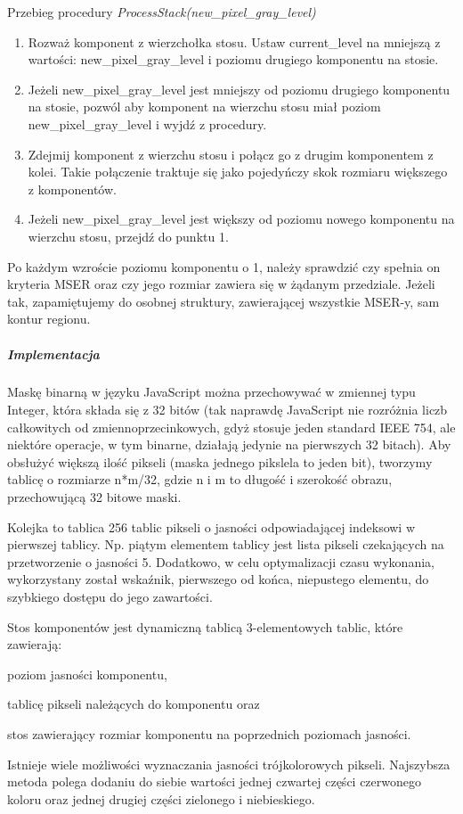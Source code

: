 Przebieg procedury \textit{ProcessStack(new\_pixel\_gray\_level)}
\begin{enumerate} \item Rozważ komponent z wierzchołka stosu. Ustaw
current\_level na mniejszą z wartości: new\_pixel\_gray\_level i poziomu
drugiego komponentu na stosie. \item Jeżeli new\_pixel\_gray\_level jest
mniejszy od poziomu drugiego komponentu na stosie, pozwól aby komponent na
wierzchu stosu miał poziom new\_pixel\_gray\_level i wyjdź z procedury. \item
Zdejmij komponent z wierzchu stosu i połącz go z drugim komponentem z kolei.
Takie połączenie traktuje się jako pojedyńczy skok rozmiaru większego z komponentów.
\item Jeżeli new\_pixel\_gray\_level jest większy od poziomu nowego komponentu
na wierzchu stosu, przejdź do punktu 1. \end{enumerate}

Po każdym wzroście poziomu komponentu o 1, należy sprawdzić czy spełnia on
kryteria MSER oraz czy jego rozmiar zawiera się w żądanym przedziale. Jeżeli
tak, zapamiętujemy do osobnej struktury, zawierającej wszystkie MSER-y, sam
kontur regionu.

\subparagraph{Implementacja}

Maskę binarną w języku JavaScript można przechowywać w zmiennej typu Integer,
która składa się z 32 bitów (tak naprawdę JavaScript nie rozróżnia liczb
całkowitych od zmiennoprzecinkowych, gdyż stosuje jeden standard IEEE 754, ale
niektóre operacje, w tym binarne, działają jedynie na pierwszych 32 bitach).
Aby obsłużyć większą ilość pikseli (maska jednego pikslela to jeden bit),
tworzymy tablicę o rozmiarze n*m/32, gdzie n i m to długość i szerokość obrazu,
przechowującą 32 bitowe maski.

Kolejka to tablica 256 tablic pikseli o jasności odpowiadającej indeksowi w
pierwszej tablicy. Np. piątym elementem tablicy jest lista pikseli czekających
na przetworzenie o jasności 5. Dodatkowo, w celu optymalizacji czasu wykonania,
wykorzystany został wskaźnik, pierwszego od końca, niepustego elementu, do
szybkiego dostępu do jego zawartości.

Stos komponentów jest dynamiczną tablicą 3-elementowych tablic, które
zawierają: \begin{inparaenum} \item poziom jasności komponentu, \item tablicę
  pikseli należących do komponentu oraz \item stos zawierający rozmiar
  komponentu na poprzednich poziomach jasności.  
\end{inparaenum}

Istnieje wiele możliwości wyznaczania jasności trójkolorowych pikseli.
Najszybsza metoda polega dodaniu do siebie wartości jednej czwartej części
czerwonego koloru oraz jednej drugiej części zielonego i niebieskiego.
